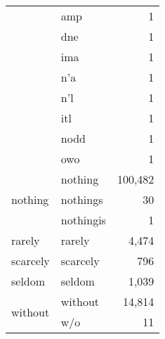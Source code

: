 \begin{longtable}[ht]{llr}
 & amp & {\cellcolor[HTML]{FFFFD9}} \color[HTML]{000000} 1 \\
 & dne & {\cellcolor[HTML]{FFFFD9}} \color[HTML]{000000} 1 \\
 & ima & {\cellcolor[HTML]{FFFFD9}} \color[HTML]{000000} 1 \\
 & n'a & {\cellcolor[HTML]{FFFFD9}} \color[HTML]{000000} 1 \\
 & n'l & {\cellcolor[HTML]{FFFFD9}} \color[HTML]{000000} 1 \\
 & itl & {\cellcolor[HTML]{FFFFD9}} \color[HTML]{000000} 1 \\
 & nodd & {\cellcolor[HTML]{FFFFD9}} \color[HTML]{000000} 1 \\
 & owo & {\cellcolor[HTML]{FFFFD9}} \color[HTML]{000000} 1 \\
\cline{1-3}
\multirow[c]{3}{*}{nothing} & nothing & {\cellcolor[HTML]{F8FCCA}} \color[HTML]{000000} 100,482 \\
 & nothings & {\cellcolor[HTML]{FFFFD9}} \color[HTML]{000000} 30 \\
 & nothingis & {\cellcolor[HTML]{FFFFD9}} \color[HTML]{000000} 1 \\
\cline{1-3}
rarely & rarely & {\cellcolor[HTML]{FFFFD9}} \color[HTML]{000000} 4,474 \\
\cline{1-3}
scarcely & scarcely & {\cellcolor[HTML]{FFFFD9}} \color[HTML]{000000} 796 \\
\cline{1-3}
seldom & seldom & {\cellcolor[HTML]{FFFFD9}} \color[HTML]{000000} 1,039 \\
\cline{1-3}
\multirow[c]{2}{*}{without} & without & {\cellcolor[HTML]{FEFFD8}} \color[HTML]{000000} 14,814 \\
 & w/o & {\cellcolor[HTML]{FFFFD9}} \color[HTML]{000000} 11 \\
\cline{1-3}
\end{longtable}
